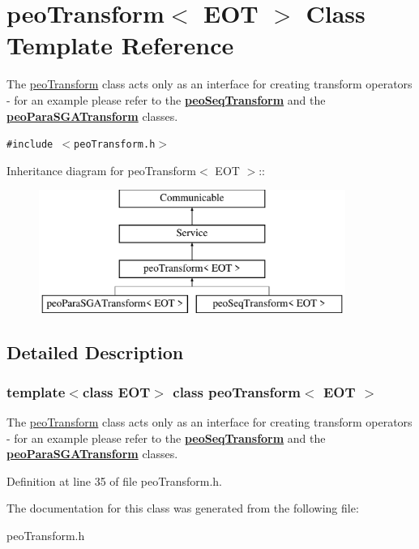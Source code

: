\hypertarget{classpeoTransform}{
\section{peo\-Transform$<$ EOT $>$ Class Template Reference}
\label{classpeoTransform}
}
The \hyperlink{classpeoTransform}{peo\-Transform} class acts only as an interface for creating transform operators - for an example please refer to the {\bf \hyperlink{classpeoSeqTransform}{peo\-Seq\-Transform}} and the {\bf \hyperlink{classpeoParaSGATransform}{peo\-Para\-SGATransform}} classes.  


{\tt \#include $<$peo\-Transform.h$>$}

Inheritance diagram for peo\-Transform$<$ EOT $>$::\begin{figure}[H]
\begin{center}
\leavevmode
\includegraphics[height=4cm]{classpeoTransform}
\end{center}
\end{figure}


\subsection{Detailed Description}
\subsubsection*{template$<$class EOT$>$ class peo\-Transform$<$ EOT $>$}

The \hyperlink{classpeoTransform}{peo\-Transform} class acts only as an interface for creating transform operators - for an example please refer to the {\bf \hyperlink{classpeoSeqTransform}{peo\-Seq\-Transform}} and the {\bf \hyperlink{classpeoParaSGATransform}{peo\-Para\-SGATransform}} classes. 



Definition at line 35 of file peo\-Transform.h.

The documentation for this class was generated from the following file:\begin{CompactItemize}
\item 
peo\-Transform.h\end{CompactItemize}

